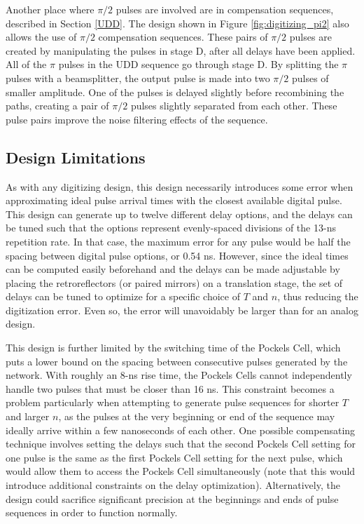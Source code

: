 \documentclass[pdftex,12pt,a4paper]{article}
\begin{document}
Another place where $\pi/2$ pulses are involved are in compensation sequences, described in Section \ref{UDD}. The design shown in Figure \ref{fig:digitizing_pi2} also allows the use of $\pi/2$ compensation sequences. These pairs of $\pi/2$ pulses are created by manipulating the pulses in stage D, after all delays have been applied. All of the $\pi$ pulses in the UDD sequence go through stage D. By splitting the $\pi$ pulses with a beamsplitter, the output pulse is made into two $\pi/2$ pulses of smaller amplitude. One of the pulses is delayed slightly before recombining the paths, creating a pair of $\pi/2$ pulses slightly separated from each other. These pulse pairs improve the noise filtering effects of the sequence\cite{ devitt_requirements_2013}.




\subsection{Design Limitations}
As with any digitizing design, this design necessarily introduces some error when approximating ideal pulse arrival times with the closest available digital pulse. This design can generate up to twelve different delay options, and the delays can be tuned such that the options represent evenly-spaced divisions of the 13-ns repetition rate. In that case, the maximum error for any pulse would be half the spacing between digital pulse options, or 0.54 ns. However, since the ideal times can be computed easily beforehand and the delays can be made adjustable by placing the retroreflectors (or paired mirrors) on a translation stage, the set of delays can be tuned to optimize for a specific choice of $T$ and $n$, thus reducing the digitization error. Even so, the error will unavoidably be larger than for an analog design.

This design is further limited by the switching time of the Pockels Cell, which puts a lower bound on the spacing between consecutive pulses generated by the network. With roughly an 8-ns rise time, the Pockels Cells cannot independently handle two pulses that must be closer than 16 ns. This constraint becomes a problem particularly when attempting to generate pulse sequences for shorter $T$ and larger $n$, as the pulses at the very beginning or end of the sequence may ideally arrive within a few nanoseconds of each other. One possible compensating technique involves setting the delays such that the second Pockels Cell setting for one pulse is the same as the first Pockels Cell setting for the next pulse, which would allow them to access the Pockels Cell simultaneously (note that this would introduce additional constraints on the delay optimization). Alternatively, the design could sacrifice significant precision at the beginnings and ends of pulse sequences in order to function normally.
\end{document}
